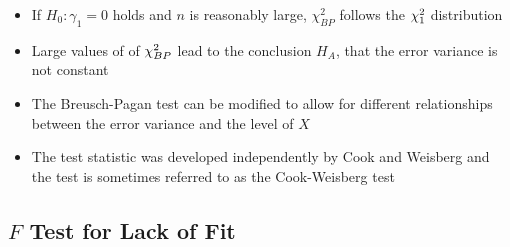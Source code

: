 \begin{itemize}
\begin{itemize}
\item If $H_0: \gamma_1 = 0$ holds and $n$ is reasonably large, $\chi^2_{BP}$ follows the $\chi^2_{1}$ distribution 
\item Large values of of $\chi^2_{BP}$ lead to the conclusion $H_A$, that the error variance is not constant
\item The Breusch-Pagan test can be modified to allow for different relationships between the error variance and the level of $X$ 
\item The test statistic was developed independently by Cook and Weisberg and the test is sometimes referred to as the Cook-Weisberg test
\end{itemize} 
\end{itemize} 

\subsection{$F$ Test for Lack of Fit}
